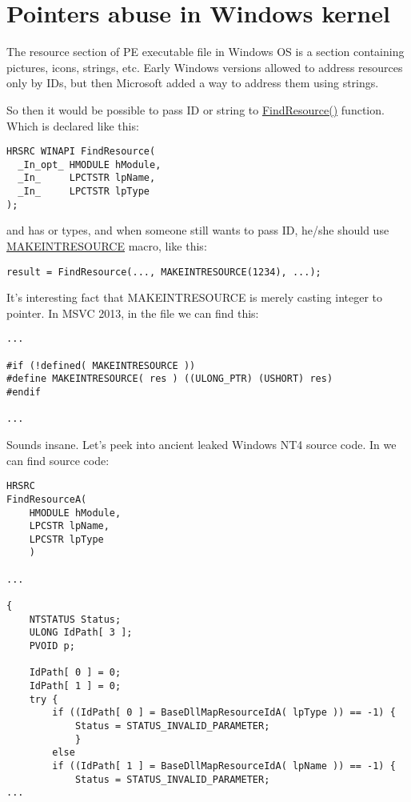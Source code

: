\section{Pointers abuse in Windows kernel}

The resource section of PE executable file in Windows OS is a section containing pictures, icons, strings, etc.
Early Windows versions allowed to address resources only by IDs, but then Microsoft added a way to address them using strings.

So then it would be possible to pass ID or string to 
\href{https://msdn.microsoft.com/en-us/library/windows/desktop/ms648042%28v=vs.85%29.aspx}{FindResource()} function.
Which is declared like this:

\begin{lstlisting}
HRSRC WINAPI FindResource(
  _In_opt_ HMODULE hModule,
  _In_     LPCTSTR lpName,
  _In_     LPCTSTR lpType
);
\end{lstlisting}

 and  has  or  types, and when someone still wants to pass ID, he/she should use
\href{https://msdn.microsoft.com/en-us/library/windows/desktop/ms648029%28v=vs.85%29.aspx}{MAKEINTRESOURCE} macro, like this:

\begin{lstlisting}
result = FindResource(..., MAKEINTRESOURCE(1234), ...);
\end{lstlisting}

It's interesting fact that MAKEINTRESOURCE is merely casting integer to pointer.
In MSVC 2013, in the file  we can find this:

\begin{lstlisting}
...

#if (!defined( MAKEINTRESOURCE )) 
#define MAKEINTRESOURCE( res ) ((ULONG_PTR) (USHORT) res)
#endif

...
\end{lstlisting}

Sounds insane. Let's peek into ancient leaked Windows NT4 source code.
In  we can find  source code:

\begin{lstlisting}
HRSRC
FindResourceA(
    HMODULE hModule,
    LPCSTR lpName,
    LPCSTR lpType
    )

...

{
    NTSTATUS Status;
    ULONG IdPath[ 3 ];
    PVOID p;

    IdPath[ 0 ] = 0;
    IdPath[ 1 ] = 0;
    try {
        if ((IdPath[ 0 ] = BaseDllMapResourceIdA( lpType )) == -1) {
            Status = STATUS_INVALID_PARAMETER;
            }
        else
        if ((IdPath[ 1 ] = BaseDllMapResourceIdA( lpName )) == -1) {
            Status = STATUS_INVALID_PARAMETER;
...
\end{lstlisting}

